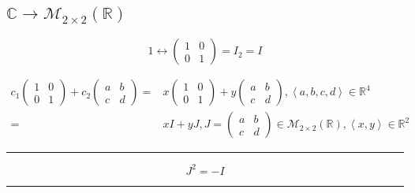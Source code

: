 \documentclass[
]{book}
\theoremstyle{definition}
\theoremstyle{definition}
\theoremstyle{definition}
\theoremstyle{definition}
\theoremstyle{remark}
\begin{document}
\hypertarget{mathbbcrightarrowmathcalm_2times2leftmathbbrright}{%
\subsection{\texorpdfstring{\(\mathbb{C}\rightarrow\mathcal{M}_{2\times2}\left(\mathbb{R}\right)\)}{\textbackslash mathbb\{C\}\textbackslash rightarrow\textbackslash mathcal\{M\}\_\{2\textbackslash times2\}\textbackslash left(\textbackslash mathbb\{R\}\textbackslash right)}}\label{mathbbcrightarrowmathcalm_2times2leftmathbbrright}}

\[
1\leftrightarrow\begin{pmatrix}1 & 0\\
0 & 1
\end{pmatrix}=I_{2}=I
\]

\[
\begin{aligned}
c_{{\scriptscriptstyle 1}}\begin{pmatrix}1 & 0\\
0 & 1
\end{pmatrix}+c_{{\scriptscriptstyle 2}}\begin{pmatrix}a & b\\
c & d
\end{pmatrix}= & x\begin{pmatrix}1 & 0\\
0 & 1
\end{pmatrix}+y\begin{pmatrix}a & b\\
c & d
\end{pmatrix},\left\langle a,b,c,d\right\rangle \in\mathbb{R}^{4}\\
= & xI+yJ,J=\begin{pmatrix}a & b\\
c & d
\end{pmatrix}\in\mathcal{M}_{2\times2}\left(\mathbb{R}\right),\left\langle x,y\right\rangle \in\mathbb{R}^{2}
\end{aligned}
\]

\begin{center}\rule{0.5\linewidth}{0.5pt}\end{center}

\[
J^{2}=-I
\]

\begin{center}\rule{0.5\linewidth}{0.5pt}\end{center}
\end{document}
